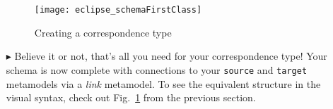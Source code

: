 \begin{itemize}
\begin{figure}[htbp]
\begin{center}
  \texttt{[image: eclipse\_schemaFirstClass]}
  \caption{Creating a correspondence type}
  \label{fig:firstCorrType}
\end{center}
\end{figure}

\item[$\blacktriangleright$] Believe it or not, that's all you need for your correspondence type! Your schema is now complete with connections to your
\texttt{source} and \texttt{target} metamodels via a \emph{link} metamodel. To see the equivalent structure in the visual syntax, check out
Fig.~\ref{fig:firstCorrType} from the previous section.

\end{itemize}
